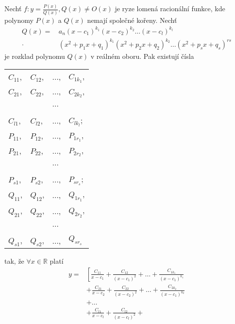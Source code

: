 \begin{veta}
    Nechť $f: y=\frac{P(x)}{Q(x)}, Q(x) \ne O(x)$ je ryze lomená
    racionální funkce, kde polynomy $P(x)$ a $Q(x)$ nemají společné
    kořeny. Nechť
    \begin{align*}
        Q(x) = & \, a_n(x-c_1)^{k_1}(x-c_2)^{k_2} \dots
        (x-c_l)^{k_l} \\
        \cdot & \, (x^2+p_1x + q_1)^{k_1}(x^2+p_2x+q_2)
        ^{k_2} \dots (x^2+p_sx+q_s)^{rs}
    \end{align*}
    je rozklad polynomu $Q(x)$ v reálném oboru. Pak existují čísla
    \begin{center}
        \begin{tabular}{l l l l}
            $C_{11}$, & $C_{12}$, & $\dots$, & $C_{1k_1}$, \\
            $C_{21}$, & $C_{22}$, & $\dots$, & $C_{2k_2}$, \\
            \,        & \,        & $\dots$  & \,          \\
            $C_{l1}$, & $C_{l2}$, & $\dots$, & $C_{lk_l}$; \\
            $P_{11}$, & $P_{12}$, & $\dots$, & $P_{1r_1}$, \\
            $P_{21}$, & $P_{22}$, & $\dots$, & $P_{2r_2}$, \\
            \,        & \,        & $\dots$  & \,          \\
            $P_{s1}$, & $P_{s2}$, & $\dots$, & $P_{sr_s}$; \\
            $Q_{11}$, & $Q_{12}$, & $\dots$, & $Q_{1r_1}$, \\
            $Q_{21}$, & $Q_{22}$, & $\dots$, & $Q_{2r_2}$, \\
            \,        & \,        & $\dots$  & \,          \\
            $Q_{s1}$, & $Q_{s2}$, & $\dots$, & $Q_{sr_s}$
        \end{tabular}
    \end{center}
    tak, že $\forall x \in \mathbb R$ platí
    \begin{align*}
        y = & \left [
              \frac{C_{11}}{x-c_1} + \frac{C_{12}}{(x-c_1)^2} +
              \dots + \frac{C_{1k_1}}{(x-c_1)^{k_1}} \right . \\
          & + \frac{C_{21}}{x-c_2} + \frac{C_{22}}{(x-c_2)^2} +
              \dots + \frac{C_{2k_2}}{(x-c_1)^{k_2}} \\
          & + \dots \\
          & + \frac{C_{l1}}{x-c_l} + \frac{C_{l2}}{(x-c_l)^2} +

\end{align*}
\end{veta}
